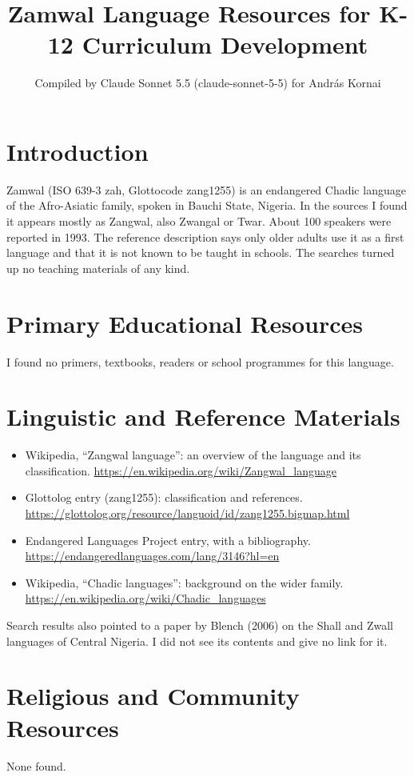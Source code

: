 \documentclass[12pt]{article}
\title{Zamwal Language Resources for K-12 Curriculum Development}
\author{Compiled by Claude Sonnet 5.5 (claude-sonnet-5-5) for Andr\'as Kornai}
\date{}
\begin{document}
\maketitle

\section{Introduction}
Zamwal (ISO 639-3 zah, Glottocode zang1255) is an endangered Chadic language of the Afro-Asiatic family, spoken in Bauchi State, Nigeria. In the sources I found it appears mostly as Zangwal, also Zwangal or Twar. About 100 speakers were reported in 1993. The reference description says only older adults use it as a first language and that it is not known to be taught in schools. The searches turned up no teaching materials of any kind.

\section{Primary Educational Resources}
I found no primers, textbooks, readers or school programmes for this language.

\section{Linguistic and Reference Materials}
\begin{itemize}
\item Wikipedia, ``Zangwal language'': an overview of the language and its classification. \url{https://en.wikipedia.org/wiki/Zangwal_language}
\item Glottolog entry (zang1255): classification and references. \url{https://glottolog.org/resource/languoid/id/zang1255.bigmap.html}
\item Endangered Languages Project entry, with a bibliography. \url{https://endangeredlanguages.com/lang/3146?hl=en}
\item Wikipedia, ``Chadic languages'': background on the wider family. \url{https://en.wikipedia.org/wiki/Chadic_languages}
\end{itemize}
Search results also pointed to a paper by Blench (2006) on the Shall and Zwall languages of Central Nigeria. I did not see its contents and give no link for it.

\section{Religious and Community Resources}
None found.
\end{document}
